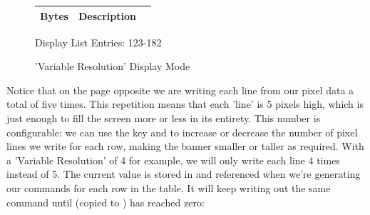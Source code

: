 \begin{minipage}[b]{0.31\linewidth}
  \begin{figure}[H]
    {
      \setlength{\tabcolsep}{3.0pt}
      \setlength\cmidrulewidth{\heavyrulewidth} %
      \begin{adjustbox}{height=8.5cm}

        \begin{tabular}{lll}
          \toprule
          Bytes       & Description                                                         \\
          \midrule
        \end{tabular}

      \end{adjustbox}

    }\caption*{Display List Entries: 123-182}
  \end{figure}
\end{minipage}

\clearpage
\begin{figure}[H]
    \centering
    \begin{adjustbox}{width=12cm,center}
    \end{adjustbox}
\caption{'Variable Resolution' Display Mode}
\end{figure}

Notice that on the page opposite we are writing each line from our pixel data a total of five times. This repetition
means that each 'line' is 5 pixels high, which is just enough to fill the screen more or less in its entirety. This
number is configurable: we can use the  key and  to increase or decrease the number of pixel
lines we write for each row, making the banner smaller or taller as required. With a 'Variable Resolution' of 4 for
example, we will only write each line 4 times instead of 5. The current value is stored in 
and referenced when we're generating our  commands for each row in the table. It will keep writing
out the same command until  (copied to ) has reached zero:

